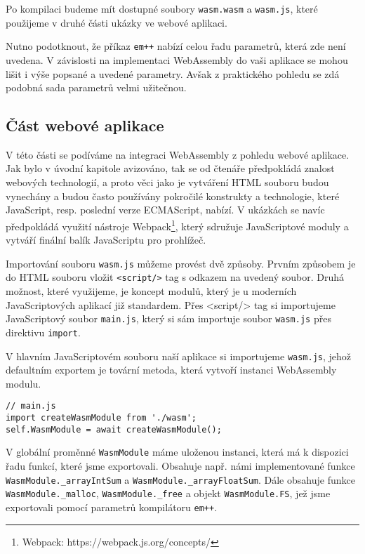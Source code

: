 \documentclass{{template/ctuthesis}}
\begin{document}
Po kompilaci budeme mít dostupné soubory \texttt{wasm.wasm} a \texttt{wasm.js}, které použijeme v druhé části ukázky ve webové aplikaci.

Nutno podotknout, že příkaz \texttt{em++} nabízí celou řadu parametrů, která zde není uvedena. V závislosti na implementaci WebAssembly do vaši aplikace se mohou lišit i výše popsané a uvedené parametry. Avšak z praktického pohledu se zdá podobná sada parametrů velmi užitečnou.

\subsection{Část webové aplikace}

V této části se podíváme na integraci WebAssembly z pohledu webové aplikace. Jak bylo v úvodní kapitole avizováno, tak se od čtenáře předpokládá znalost webových technologií, a proto věci jako je vytváření HTML souboru budou vynechány a budou často používány pokročilé konstrukty a technologie, které JavaScript, resp. poslední verze ECMAScript, nabízí. V ukázkách se navíc předpokládá využití nástroje Webpack\footnote{Webpack: https://webpack.js.org/concepts/}, který sdružuje JavaScriptové moduly a vytváří finální balík JavaScriptu pro prohlížeč.

Importování souboru \texttt{wasm.js} můžeme provést dvě způsoby. Prvním způsobem je do HTML souboru vložit \texttt{<script/>} tag s odkazem na uvedený soubor. Druhá možnost, které využijeme, je koncept modulů, který je u moderních JavaScriptových aplikací již standardem. Přes <script/> tag si importujeme JavaScriptový soubor \texttt{main.js}, který si sám importuje soubor \texttt{wasm.js} přes direktivu \texttt{import}.

V hlavním JavaScriptovém souboru naší aplikace si importujeme \texttt{wasm.js}, jehož defaultním exportem je tovární metoda, která vytvoří instanci WebAssembly modulu.

\begin{verbatim}
// main.js
import createWasmModule from './wasm';
self.WasmModule = await createWasmModule();
\end{verbatim}

V globální proměnné \texttt{WasmModule} máme uloženou instanci, která má k dispozici řadu funkcí, které jsme exportovali.
Obsahuje např. námi implementované funkce \texttt{WasmModule.\_arrayIntSum} a \texttt{WasmModule.\_arrayFloatSum}. Dále obsahuje funkce \texttt{WasmModule.\_malloc}, \texttt{WasmModule.\_free} a objekt \texttt{WasmModule.FS}, jež jsme exportovali pomocí parametrů kompilátoru \texttt{em++}.
\end{document}
